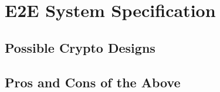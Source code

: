 \chapter{E2E System Specification}

\section{Possible Crypto Designs}

\section{Pros and Cons of the Above}

